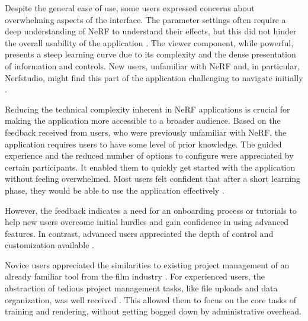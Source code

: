 Despite the general ease of use, some users expressed concerns about overwhelming aspects of the interface.
The parameter settings often require a deep understanding of NeRF to understand their effects, but this did not hinder the overall usability of the application \cite{P5, P7}.
The viewer component, while powerful, presents a steep learning curve due to its complexity and the dense presentation of information and controls. 
New users, unfamiliar with NeRF and, in particular, Nerfstudio, might find this part of the application challenging to navigate initially \cite{P2}.


Reducing the technical complexity inherent in NeRF applications is crucial for making the application more accessible to a broader audience.
Based on the feedback received from users, who were previously unfamiliar with NeRF, the application requires users to have some level of prior knowledge.
The guided experience and the reduced number of options to configure were appreciated by certain participants.
It enabled them to quickly get started with the application without feeling overwhelmed.
Most users felt confident that after a short learning phase, they would be able to use the application effectively \cite{P2, P3, P4, P5, P6, P7, P8}.

However, the feedback indicates a need for an onboarding process or tutorials to help new users overcome initial hurdles and gain confidence in using advanced features.
In contrast, advanced users appreciated the depth of control and customization available \cite{P9, P10}.


Novice users appreciated the similarities to existing project management of an already familiar tool from the film industry \cite{P5}. 
For experienced users, the abstraction of tedious project management tasks, like file uploads and data organization, was well received \cite{P1}.
This allowed them to focus on the core tasks of training and rendering, without getting bogged down by administrative overhead.

